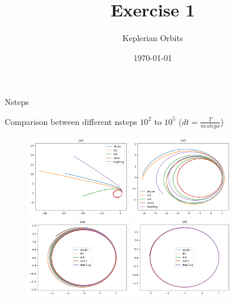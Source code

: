 \documentclass{beamer}
\title{Exercise 1}
\subtitle{Keplerian Orbits}
\date{\today}
\begin{document}
\begin{frame}
    \titlepage
\end{frame}

\begin{frame}{Nsteps}

	Comparison between different nsteps $10^2$ to $10^5$ ($dt = \frac{T}{nesteps}$)

\begin{figure}
\centering
    \includegraphics[width=0.4\textwidth]{plots/1e2_plot.png}
    \includegraphics[width=0.4\textwidth]{plots/1e3_plot.png}
    \includegraphics[width=0.4\textwidth]{plots/1e4_plot.png}
    \includegraphics[width=0.4\textwidth]{plots/1e5_plot.png}
    \label{fig:question}
\end{figure}
\end{frame}
\end{document}

